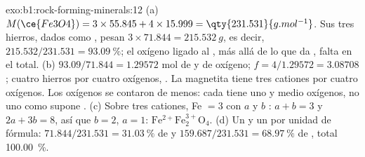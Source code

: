 \begin{solution}{exo:b1:rock-forming-minerals:12}
(a) $M(\ce{Fe3O4}) = 3\times55.845 + 4\times15.999 = \qty{231.531}{g.mol^{-1}}$.
Sus tres hierros, dados como , pesan $3\times71.844 = \qty{215.532}{g}$,
es decir, $215.532/231.531 = \qty{93.09}{\percent}$; el oxígeno ligado al
, más allá de lo que da , falta en el total.
(b) $93.09/71.844 = 1.29572$ mol de  y de oxígeno; $f =
4/1.29572 = 3.08708$; cuatro hierros por cuatro oxígenos, . La magnetita tiene
tres cationes por cuatro oxígenos. Los oxígenos se contaron de menos: cada  tiene uno y medio
oxígenos, no uno como supone . (c) Sobre tres cationes, Fe $= 3$ con $a$  y $b$ :
$a + b = 3$ y $2a + 3b = 8$, así que $b = 2$, $a = 1$: $\mathrm{Fe^{2+}Fe^{3+}_2O_4}$. (d) Un  y un
 por unidad de fórmula: $71.844/231.531 = \qty{31.03}{\percent}$ de  y
$159.687/231.531 = \qty{68.97}{\percent}$ de , total \qty{100.00}{\percent}.
\end{solution}

